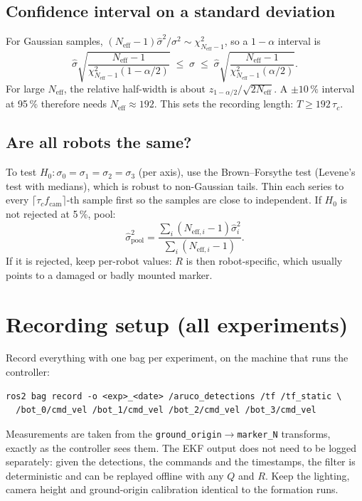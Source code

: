 \documentclass[11pt,a4paper]{article}
\begin{document}
\subsection{Confidence interval on a standard deviation}
For Gaussian samples, $(N_\text{eff}-1)\hat\sigma^2/\sigma^2\sim\chi^2_{N_\text{eff}-1}$, so a
$1-\alpha$ interval is
\begin{equation}
  \hat\sigma\sqrt{\frac{N_\text{eff}-1}{\chi^2_{N_\text{eff}-1}(1-\alpha/2)}}
  \;\le\;\sigma\;\le\;
  \hat\sigma\sqrt{\frac{N_\text{eff}-1}{\chi^2_{N_\text{eff}-1}(\alpha/2)}} .
\end{equation}
For large $N_\text{eff}$, the relative half-width is about
$z_{1-\alpha/2}/\sqrt{2N_\text{eff}}$. A $\pm10\,\%$ interval at 95\,\%
therefore needs $N_\text{eff}\approx 192$. This sets the recording length:
$T\ge 192\,\tau_c$.

\subsection{Are all robots the same?}
To test $H_0:\sigma_0=\sigma_1=\sigma_2=\sigma_3$ (per axis), use the
Brown--Forsythe test (Levene's test with medians), which is robust to
non-Gaussian tails. Thin each series to every $\lceil\tau_c f_\text{cam}\rceil$-th
sample first so the samples are close to independent. If $H_0$ is not
rejected at 5\,\%, pool:
\begin{equation}
  \hat\sigma^2_\text{pool}=\frac{\sum_i (N_{\text{eff},i}-1)\hat\sigma_i^2}{\sum_i (N_{\text{eff},i}-1)}.
\end{equation}
If it is rejected, keep per-robot values: $R$ is then robot-specific,
which usually points to a damaged or badly mounted marker.

\section{Recording setup (all experiments)}

Record everything with one bag per experiment, on the machine that runs
the controller:
\begin{lstlisting}
ros2 bag record -o <exp>_<date> /aruco_detections /tf /tf_static \
  /bot_0/cmd_vel /bot_1/cmd_vel /bot_2/cmd_vel /bot_3/cmd_vel
\end{lstlisting}
Measurements are taken from the \texttt{ground\_origin}$\to$\texttt{marker\_N}
transforms, exactly as the controller sees them. The EKF output does not
need to be logged separately: given the detections, the commands and the
timestamps, the filter is deterministic and can be replayed offline with
any $Q$ and $R$. Keep the lighting, camera height and ground-origin
calibration identical to the formation runs.
\end{document}
